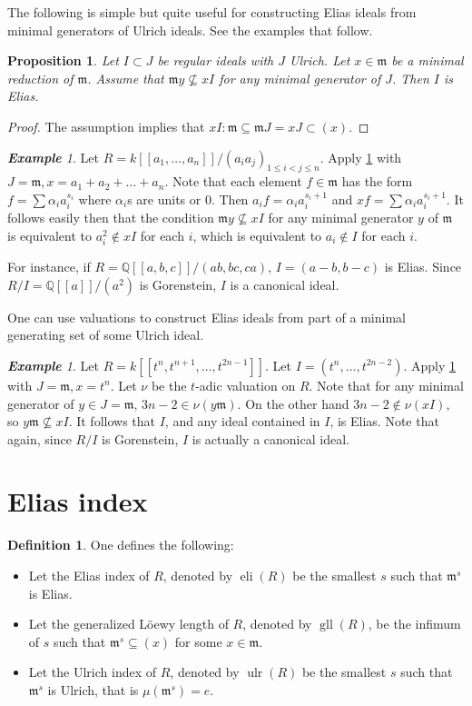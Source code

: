 \documentclass[a4paper,12pt]{amsart}
\newtheorem{prop}[thm]{\bf Proposition}
\theoremstyle{definition}
\newtheorem{definition}[thm]{\bf Definition}
\theoremstyle{remark}
\newtheorem{example}[thm]{\bf Example}
\numberwithin{equation}{section}
\DeclareMathOperator{\eli}{{eli}}
\DeclareMathOperator{\gll}{gll}
\DeclareMathOperator{\ulr}{{ulr}}
\def\fm{\mathfrak{m}}
\def \QQ{\mathbb Q}
\begin{document}
The following is simple but quite useful for constructing Elias ideals from minimal generators of Ulrich ideals. See the examples that follow. 

\begin{prop}\label{UElias}
Let $I\subset J$ be regular ideals with $J$ Ulrich. Let $x\in \fm$ be a minimal reduction of $\fm$.  Assume that $\fm y\not\subseteq xI$ for any minimal generator of $J$. Then $I$ is Elias. 
\end{prop}

\begin{proof}
The assumption implies that $xI:\fm\subseteq \fm J = xJ\subset (x)$. 
\end{proof}


\begin{example}
Let $R=k[[a_1,\dots, a_n]]/(a_ia_j)_{1\leq i< j\leq n}$. Apply \ref{UElias} with  $J=\fm, x=a_1+a_2+\dots +a_n$. Note that each element  $f\in \fm$ has the form $f= \sum \alpha_ia_i^{s_i}$ where $\alpha_i$s are units or $0$. Then $a_if= \alpha_i a_i^{s_i+1}$ and $xf = \sum  \alpha_ia_i^{s_i+1}$. It follows easily then that the condition $\fm y\not\subseteq xI$ for any minimal generator $y$ of $\fm$ is equivalent to $a_i^2\notin xI$ for each $i$, which is equivalent to $a_i\notin I$ for each $i$. 

For instance, if $R=\QQ[[a,b,c]]/(ab,bc,ca)$, $I=(a-b,b-c)$ is Elias. Since $R/I = \QQ[[a]]/(a^2)$ is Gorenstein, $I$ is a canonical ideal. 
\end{example}
One can use valuations to construct Elias ideals from part of a minimal generating set of some Ulrich ideal. 

\begin{example}
Let $R=k[[t^n, t^{n+1},\dots, t^{2n-1}]]$. Let $I= (t^n,\dots, t^{2n-2})$. Apply  \ref{UElias} with  $J=\fm, x=t^n$. Let $\nu$ be the $t$-adic  valuation on $R$.   Note that for any minimal generator of $y\in J=\fm$, $3n-2\in \nu(y\fm)$. On the other hand $3n-2\notin \nu(xI)$, so $y\fm \not\subseteq xI$. It follows that $I$, and any ideal contained in $I$, is Elias. Note that again, since $R/I$ is Gorenstein, $I$ is actually a canonical ideal. 
\end{example}


\section{Elias index}\label{sec3} 


\begin{definition} One defines the following:
\begin{itemize}
 \item Let the Elias index of $R$, denoted by $\eli(R)$ be the smallest $s$ such that $\fm^s$ is Elias. 
 \item Let the generalized L\"oewy length of $R$, denoted by $\gll(R)$, be the infimum of $s$ such that $\fm^s\subseteq (x)$ for some $x\in \fm$. 
 \item Let the Ulrich index  of $R$, denoted by $\ulr(R)$ be the smallest $s$ such that $\fm^s$ is Ulrich, that is $\mu(\fm^s)=e$. 
  \end{itemize}
\end{definition}
\end{document}
